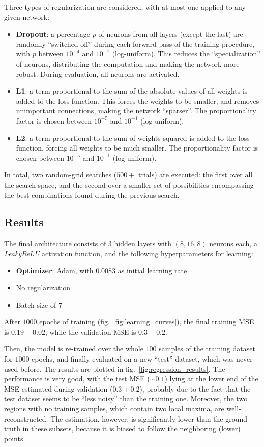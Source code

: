 \documentclass[11pt,a4paper]{scrartcl}
\newcommand{\q}[1]{``#1''}
\begin{document}
Three types of regularization are considered, with at most one applied to any given network:
\begin{itemize}
    \item \textbf{Dropout}: a percentage $p$ of neurons from all layers (except the last) are randomly \q{switched off} during each forward pass of the training procedure, with $p$ between $10^{-4}$ and $10^{-1}$ (log-uniform). This reduces the \q{specialization} of neurons, distributing the computation and making the network more robust. During evaluation, all neurons are activated.
    \item \textbf{L1}: a term proportional to the sum of the absolute values of all weights is added to the loss function. This forces the weights to be smaller, and removes unimportant connections, making the network \q{sparser}. The proportionality factor is chosen between $10^{-5}$ and $10^{-1}$ (log-uniform).
    \item \textbf{L2}: a term proportional to the sum of weights squared is added to the loss function, forcing all weights to be much smaller. The proportionality factor is chosen between $10^{-5}$ and $10^{-1}$ (log-uniform).
\end{itemize}
In total, two random-grid searches ($500+$ trials) are executed: the first over all the search space, and the second over a smaller set of possibilities encompassing the best combinations found during the previous search.


\subsection{Results}
The final architecture consists of $3$ hidden layers with $(8, 16, 8)$ neurons each, a \textit{LeakyReLU} activation function, and the following hyperparameters for learning:
\begin{itemize}
    \item \textbf{Optimizer}: Adam, with $0.0083$ as initial learning rate
    \item No regularization
    \item Batch size of $7$
\end{itemize}
After $1000$ epochs of training (fig.~\ref{fig:learning_curves}), the final training MSE is $0.19 \pm 0.02$, while the validation MSE is $0.3 \pm 0.2$.

\medskip

Then, the model is re-trained over the whole $100$ samples of the training dataset for $1000$ epochs, and finally evaluated on a new \q{test} dataset, which was never used before. The results are plotted in fig.~\ref{fig:regression_results}. The performance is very good, with the test MSE ($\sim 0.1$) lying at the lower end of the MSE estimated during validation ($0.3 \pm 0.2$), probably due to the fact that the test dataset seems to be \q{less noisy} than the training one. Moreover, the two regions with no training samples, which contain two local maxima, are well-reconstructed. The estimation, however, is significantly lower than the ground-truth in these subsets, because it is biased to follow the neighboring (lower) points.
\end{document}
